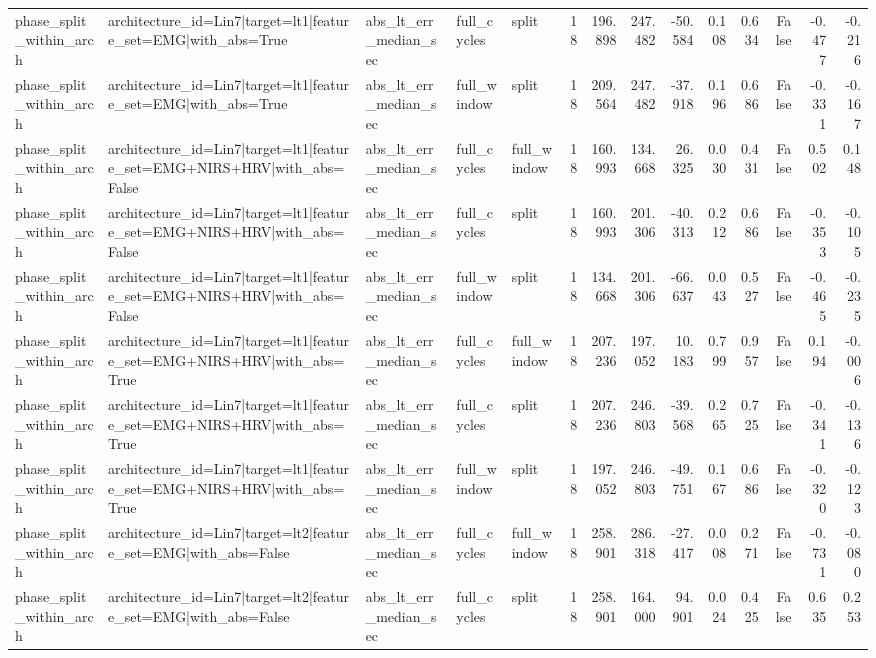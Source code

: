 \begin{table}
\begin{tabular}{lllllrrrrrrrrr}
phase_split_within_arch & architecture_id=Lin7|target=lt1|feature_set=EMG|with_abs=True & abs_lt_err_median_sec & full_cycles & split & 18 & 196.898 & 247.482 & -50.584 & 0.108 & 0.634 & False & -0.477 & -0.216 \\
phase_split_within_arch & architecture_id=Lin7|target=lt1|feature_set=EMG|with_abs=True & abs_lt_err_median_sec & full_window & split & 18 & 209.564 & 247.482 & -37.918 & 0.196 & 0.686 & False & -0.331 & -0.167 \\
phase_split_within_arch & architecture_id=Lin7|target=lt1|feature_set=EMG+NIRS+HRV|with_abs=False & abs_lt_err_median_sec & full_cycles & full_window & 18 & 160.993 & 134.668 & 26.325 & 0.030 & 0.431 & False & 0.502 & 0.148 \\
phase_split_within_arch & architecture_id=Lin7|target=lt1|feature_set=EMG+NIRS+HRV|with_abs=False & abs_lt_err_median_sec & full_cycles & split & 18 & 160.993 & 201.306 & -40.313 & 0.212 & 0.686 & False & -0.353 & -0.105 \\
phase_split_within_arch & architecture_id=Lin7|target=lt1|feature_set=EMG+NIRS+HRV|with_abs=False & abs_lt_err_median_sec & full_window & split & 18 & 134.668 & 201.306 & -66.637 & 0.043 & 0.527 & False & -0.465 & -0.235 \\
phase_split_within_arch & architecture_id=Lin7|target=lt1|feature_set=EMG+NIRS+HRV|with_abs=True & abs_lt_err_median_sec & full_cycles & full_window & 18 & 207.236 & 197.052 & 10.183 & 0.799 & 0.957 & False & 0.194 & -0.006 \\
phase_split_within_arch & architecture_id=Lin7|target=lt1|feature_set=EMG+NIRS+HRV|with_abs=True & abs_lt_err_median_sec & full_cycles & split & 18 & 207.236 & 246.803 & -39.568 & 0.265 & 0.725 & False & -0.341 & -0.136 \\
phase_split_within_arch & architecture_id=Lin7|target=lt1|feature_set=EMG+NIRS+HRV|with_abs=True & abs_lt_err_median_sec & full_window & split & 18 & 197.052 & 246.803 & -49.751 & 0.167 & 0.686 & False & -0.320 & -0.123 \\
phase_split_within_arch & architecture_id=Lin7|target=lt2|feature_set=EMG|with_abs=False & abs_lt_err_median_sec & full_cycles & full_window & 18 & 258.901 & 286.318 & -27.417 & 0.008 & 0.271 & False & -0.731 & -0.080 \\
phase_split_within_arch & architecture_id=Lin7|target=lt2|feature_set=EMG|with_abs=False & abs_lt_err_median_sec & full_cycles & split & 18 & 258.901 & 164.000 & 94.901 & 0.024 & 0.425 & False & 0.635 & 0.253 \\

\end{tabular}
\end{table}

